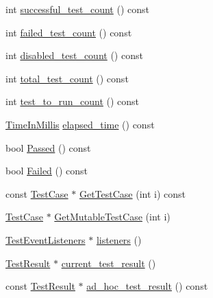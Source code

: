 \begin{DoxyCompactItemize}
\item 
int \hyperlink{classtesting_1_1internal_1_1UnitTestImpl_ab955f67bc1fe8ef62a7e72906ccece2a}{successful\-\_\-test\-\_\-count} () const 
\item 
int \hyperlink{classtesting_1_1internal_1_1UnitTestImpl_afd8bbd35c7ee99960abb321cfdff3119}{failed\-\_\-test\-\_\-count} () const 
\item 
int \hyperlink{classtesting_1_1internal_1_1UnitTestImpl_a10ec677118627074973fc20c9271b204}{disabled\-\_\-test\-\_\-count} () const 
\item 
int \hyperlink{classtesting_1_1internal_1_1UnitTestImpl_a0eb7286957aeb126d9926c33407a15a3}{total\-\_\-test\-\_\-count} () const 
\item 
int \hyperlink{classtesting_1_1internal_1_1UnitTestImpl_aa6eccf86072f4f8ddd0bea30dfd45912}{test\-\_\-to\-\_\-run\-\_\-count} () const 
\item 
\hyperlink{namespacetesting_1_1internal_a9e0fb32f592d143f031a3431366adae0}{\-Time\-In\-Millis} \hyperlink{classtesting_1_1internal_1_1UnitTestImpl_a4f91886b546ea9cc5ba2d374a62f3a9c}{elapsed\-\_\-time} () const 
\item 
bool \hyperlink{classtesting_1_1internal_1_1UnitTestImpl_ac97d5073365af8a73262fd9f6bf18656}{\-Passed} () const 
\item 
bool \hyperlink{classtesting_1_1internal_1_1UnitTestImpl_a7cf078354304c964c1934f53bf2bb4d7}{\-Failed} () const 
\item 
const \hyperlink{classtesting_1_1TestCase}{\-Test\-Case} $\ast$ \hyperlink{classtesting_1_1internal_1_1UnitTestImpl_adced0a9df4be306d905a3f954fc3eedf}{\-Get\-Test\-Case} (int i) const 
\item 
\hyperlink{classtesting_1_1TestCase}{\-Test\-Case} $\ast$ \hyperlink{classtesting_1_1internal_1_1UnitTestImpl_a04b94a3c825711103b247aa87d6b76e3}{\-Get\-Mutable\-Test\-Case} (int i)
\item 
\hyperlink{classtesting_1_1TestEventListeners}{\-Test\-Event\-Listeners} $\ast$ \hyperlink{classtesting_1_1internal_1_1UnitTestImpl_a371c481b63deeb0ecd47f42b4720480b}{listeners} ()
\item 
\hyperlink{classtesting_1_1TestResult}{\-Test\-Result} $\ast$ \hyperlink{classtesting_1_1internal_1_1UnitTestImpl_a385bee93ae6043262a860574aa59ba1a}{current\-\_\-test\-\_\-result} ()
\item 
const \hyperlink{classtesting_1_1TestResult}{\-Test\-Result} $\ast$ \hyperlink{classtesting_1_1internal_1_1UnitTestImpl_a0cc79239ea952483734abc4999de7d8a}{ad\-\_\-hoc\-\_\-test\-\_\-result} () const 

\end{DoxyCompactItemize}
